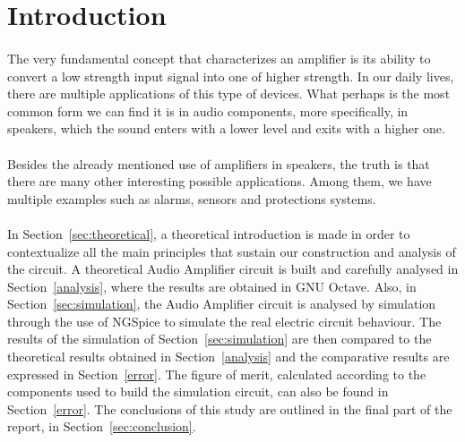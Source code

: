 \pagebreak

\section{Introduction}
\label{sec:introduction}

\paragraph{}The very fundamental concept that characterizes an amplifier is its ability to convert a low strength input signal into one of higher strength. In our daily lives, there are multiple applications of this type of devices. What perhaps is the most common form we can find it is in audio components, more specifically, in speakers, which the sound enters with a lower level and exits with a higher one. 

\paragraph{}Besides the already mentioned use of amplifiers in speakers, the truth is that there are many other interesting possible applications. Among them, we have multiple examples such as alarms, sensors and protections systems.

\paragraph{}
In Section~\ref{sec:theoretical}, a theoretical introduction is made in order to contextualize all the main principles that sustain our construction and analysis of the circuit. A theoretical Audio Amplifier circuit is built and carefully analysed in Section~\ref{analysis}, where the results are obtained in GNU Octave. Also, in Section~\ref{sec:simulation}, the Audio Amplifier circuit is analysed by simulation through the use of NGSpice to simulate the real electric circuit behaviour. The results of the simulation of Section~\ref{sec:simulation} are then compared to the theoretical results obtained in Section~\ref{analysis} and the comparative results are expressed in Section~\ref{error}. The figure of merit, calculated according to the components used to build the simulation circuit, can also be found in Section~\ref{error}. The conclusions of this study are outlined in the final part of the report, in Section~\ref{sec:conclusion}.

